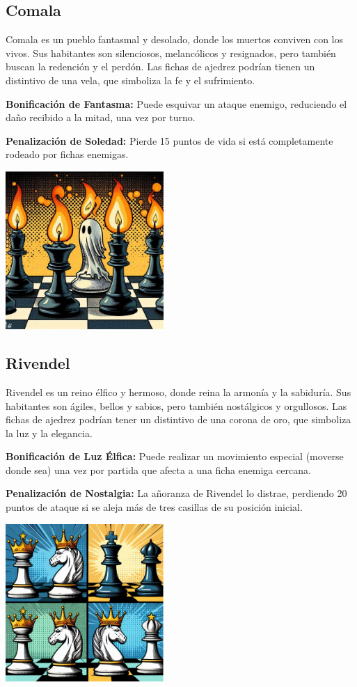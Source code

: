 \documentclass{article}
\begin{document}
\subsection{Comala}
Comala es un pueblo fantasmal y desolado, donde los muertos conviven con los vivos. Sus habitantes son silenciosos, melancólicos y resignados, pero también buscan la redención y el perdón. Las fichas de ajedrez podrían tienen un distintivo de una vela, que simboliza la fe y el sufrimiento.

\textbf{Bonificación de Fantasma:}
Puede esquivar un ataque enemigo, reduciendo el daño recibido a la mitad, una vez por turno.

\textbf{Penalización de Soledad:}
Pierde 15 puntos de vida si está completamente rodeado por fichas enemigas.
\begin{center}
    \includegraphics[width=6cm]{latex/img/Comala.png}
\end{center}
\subsection{Rivendel}
Rivendel es un reino élfico y hermoso, donde reina la armonía y la sabiduría. Sus habitantes son ágiles, bellos y sabios, pero también nostálgicos y orgullosos. Las fichas de ajedrez podrían tener un distintivo de una corona de oro, que simboliza la luz y la elegancia.

\textbf{Bonificación de Luz Élfica:}
Puede realizar un movimiento especial (moverse donde sea) una vez por partida que afecta a una ficha enemiga cercana.

\textbf{Penalización de Nostalgia:}
La añoranza de Rivendel lo distrae, perdiendo 20 puntos de ataque si se aleja más de tres casillas de su posición inicial.
\begin{center}
    \includegraphics[width=6cm]{latex/img/RIvendel.png}
\end{center}
\end{document}
